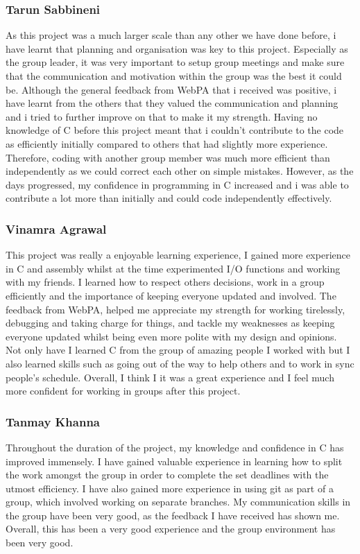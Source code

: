 \documentclass[11pt]{article}
\begin{document}
\subsubsection{Tarun Sabbineni}
As this project was a much larger scale than any other we have done before, i have learnt that planning and organisation was key to this project. Especially as the group leader, it was very important to setup group meetings and make sure that the communication and motivation within the group was the best it could be. Although the general feedback from WebPA that i received was positive, i have learnt from the others that they valued the communication and planning and i tried to further improve on that to make it my strength. Having no knowledge of C before this project meant that i couldn't contribute to the code as efficiently initially compared to others that had slightly more experience. Therefore, coding with another group member was much more efficient than independently as we could correct each other on simple mistakes. However, as the days progressed, my confidence in programming in C increased and i was able to contribute a lot more than initially and could code independently effectively. 


\subsubsection{Vinamra Agrawal}
This project was really a enjoyable learning experience, I gained more experience in C and assembly whilst at the time experimented I/O functions and working with my friends. I learned how to respect others decisions, work in a group efficiently and the importance of keeping everyone updated and involved. The feedback from WebPA, helped me appreciate my  strength for working tirelessly, debugging and taking charge for things, and tackle my weaknesses as keeping everyone updated whilst being even more polite with my design and opinions. Not only have I learned C from the group of amazing people I worked with but I also learned skills such as going out of the way to help others and to work in sync people's schedule.   Overall, I think I it was a great experience and I feel much more confident for working in groups after this project.  


\subsubsection{Tanmay Khanna}
Throughout the duration of the project, my knowledge and confidence in C has improved immensely. I have gained valuable experience in learning how to split the work amongst the group in order to complete the set deadlines with the utmost efficiency. I have also gained more experience in using git as part of a group, which involved working on separate branches. My communication skills in the group have been very good, as the feedback I have received has shown me. Overall, this has been a very good experience and the group environment has been very good.
\end{document}
